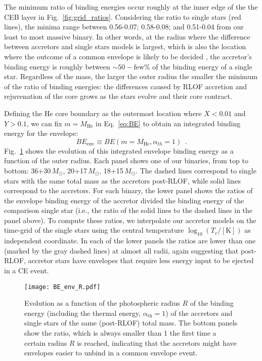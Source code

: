 \documentclass[twocolumn,twocolappendix,trackchanges]{aastex63}
\DeclareRobustCommand{\Eqref}[1]{Eq.~\ref{#1}}
\DeclareRobustCommand{\Figref}[1]{Fig.~\ref{#1}}
\begin{document}
{The minimum ratio of binding energies occur roughly at the inner edge
of the the CEB layer in \Figref{fig:grid_ratios}. Considering the
ratio to single stars (red lines), the minima range between 0.56-0.07;
0.58-0.08; and 0.51-0.04 from our least to most massive binary. In
other words, at the radius where the difference between accretors and
single stars models is largest, which is also the location where the
outcome of a common envelope is likely to be decided \citep[e.g.,][]{ivanova:2013}, the accretor's
binding energy is roughly between $\sim{}50-\mathrm{few}\%$ of the
binding energy of a single star. Regardless of the mass, the larger
the outer radius the smaller the minimum of the ratio of binding
energies: the differences caused by RLOF accretion and rejuvenation of
the core grows as the stars evolve and their core contract.

Defining the He core boundary as the outermost location where $X<0.01$
and $Y>0.1$, we can fix $m=M_\mathrm{He}$ in \Eqref{eq:BE} to obtain
an integrated binding energy for the envelope:
\begin{equation}
  \label{eq:BE_env}
  BE_\mathrm{env} \equiv BE(m=M_\mathrm{He}, \alpha_{th}=1) \ \ .
\end{equation}
\Figref{fig:BE_env_R} shows the evolution of this integrated envelope
binding energy as a function of the outer radius. Each panel shows one
of our binaries, from top to bottom: 36+30\,$M_\odot$,
20+17\,$M_\odot$, 18+15\,$M_\odot$. The dashed lines correspond to
single stars with the same total mass as the accretors post-RLOF,
while solid lines correspond to the accretors. For each binary, the
lower panel shows the ratios of the envelope binding energy of the
accretor divided the binding energy of the comparison single star
(i.e., the ratio of the solid lines to the dashed lines in the panel
above). To compute these ratios, we interpolate our accretor models
on the time-grid of the single stars using the central temperature
$\log_{10}(T_c/[\mathrm{K}])$ as independent coordinate. In each of
the lower panels the ratios are lower than one (marked by the gray
dashed lines) at almost all radii, again suggesting that post-RLOF,
accretor stars have envelopes that require less energy input to be
ejected in a CE event.

\begin{figure}[tp]
  \centering
  \texttt{[image: BE\_env\_R.pdf]}
  \caption{Evolution as a function of the photospheric radius $R$ of
    the binding energy (including the thermal
    energy, $\alpha_\mathrm{th}=1$) of the accretors and single stars
    of the same (post-RLOF) total mass. The bottom panels show the
    ratio, which is always smaller than 1 the first time a certain
    radius $R$ is reached, indicating that the
    accretors might have envelopes easier to unbind in a common
    envelope event.}
  \label{fig:BE_env_R}
\end{figure}

}
\end{document}
